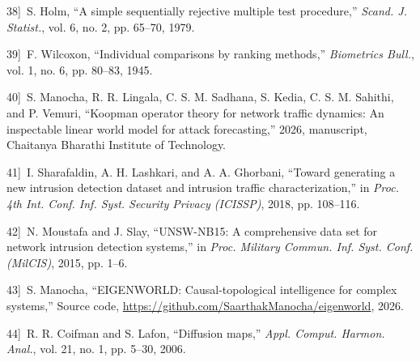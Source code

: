\documentclass{article}
\begin{document}
\noindent{}{[}38{]}~S. Holm, ``A simple sequentially rejective multiple test procedure,'' \emph{Scand. J. Statist.}, vol. 6, no. 2, pp. 65--70, 1979.

\noindent{}{[}39{]}~F. Wilcoxon, ``Individual comparisons by ranking methods,'' \emph{Biometrics Bull.}, vol. 1, no. 6, pp. 80--83, 1945.

\noindent{}{[}40{]}~S. Manocha, R. R. Lingala, C. S. M. Sadhana, S. Kedia, C. S. M. Sahithi, and P. Vemuri, ``{Koopman} operator theory for network traffic dynamics: An inspectable linear world model for attack forecasting,'' 2026, manuscript, Chaitanya Bharathi Institute of Technology.

\noindent{}{[}41{]}~I. Sharafaldin, A. H. Lashkari, and A. A. Ghorbani, ``Toward generating a new intrusion detection dataset and intrusion traffic characterization,'' in \emph{Proc. 4th Int. Conf. Inf. Syst. Security Privacy (ICISSP)}, 2018, pp. 108--116.

\noindent{}{[}42{]}~N. Moustafa and J. Slay, ``{UNSW-NB15}: A comprehensive data set for network intrusion detection systems,'' in \emph{Proc. Military Commun. Inf. Syst. Conf. (MilCIS)}, 2015, pp. 1--6.

\noindent{}{[}43{]}~S. Manocha, ``{EIGENWORLD}: Causal-topological intelligence for complex systems,'' Source code, \url{https://github.com/SaarthakManocha/eigenworld}, 2026.

\noindent{}{[}44{]}~R. R. Coifman and S. Lafon, ``Diffusion maps,'' \emph{Appl. Comput. Harmon. Anal.}, vol. 21, no. 1, pp. 5--30, 2006.
\end{document}
